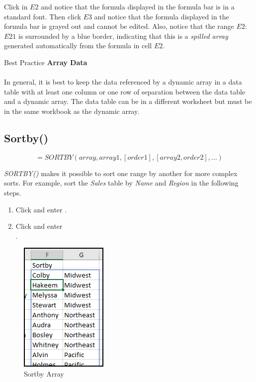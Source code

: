 Click in $ E2 $ and notice that the formula displayed in the formula bar is in a standard font. Then click $ E3 $ and notice that the formula displayed in the formula bar is grayed out and cannot be edited. Also, notice that the range $ E2 $:$ E21 $ is surrounded by a blue border, indicating that this is a \textit{spilled array} generated automatically from the formula in cell $ E2 $.

\begin{center}
	\begin{infobox}{Best Practice}
		\textbf{Array Data}
		\\
		\\
		In general, it is best to keep the data referenced by a dynamic array in a data table with at least one column or one row of separation between the data table and a dynamic array. The data table can be in a different worksheet but must be in the same workbook as the dynamic array.
	\end{infobox}
\end{center}

\subsection{Sortby()}

\[ =SORTBY(array, array1, [order1], [array2, order2],…)  \]

\textit{SORTBY()} makes it possible to sort one range by another for more complex sorts. For example, sort the \textit{Sales} table by \textit{Name} and \textit{Region} in the following steps.

\begin{enumbox}
	\begin{enumerate}
		\item Click  and enter .
		\item Click  and enter\\ . 
	\end{enumerate}
\end{enumbox}

\begin{figure}[H]
	\centering
	\includegraphics{gfx/apb_fig02}
	\caption{Sortby Array}
	\label{apb:fig02}
\end{figure}

